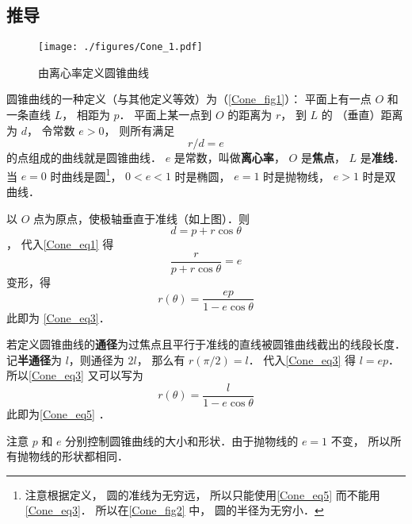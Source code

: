 \subsection{推导}


\begin{figure}[ht]
\centering
\texttt{[image: ./figures/Cone\_1.pdf]}
\caption{由离心率定义圆锥曲线}\label{Cone_fig1}
\end{figure}

圆锥曲线的一种定义（与其他定义等效）为（\autoref{Cone_fig1}）：
平面上有一点 $O$ 和一条直线 $L$， 相距为 $p$． 
平面上某一点到 $O$ 的距离为 $r$， 到 $L$ 的
（垂直）距离为 $d$， 令常数 $e > 0$， 则所有满足
\begin{equation}\label{Cone_eq1}
r/d = e
\end{equation}
的点组成的曲线就是圆锥曲线． $e$ 是常数，叫做\textbf{离心率}， $O$ 是\textbf{焦点}， $L$ 是\textbf{准线}． 当 $e = 0$ 时曲线是圆\footnote{注意根据定义， 圆的准线为无穷远， 所以只能使用\autoref{Cone_eq5} 而不能用\autoref{Cone_eq3}． 所以在\autoref{Cone_fig2} 中， 圆的半径为无穷小．}， $0 < e < 1$ 时是椭圆， $e = 1$ 时是抛物线， $e > 1$ 时是双曲线．

以 $O$ 点为原点，使极轴垂直于准线（如上图）．则 $$d = p + r \cos \theta $$， 代入\autoref{Cone_eq1} 得
\begin{equation}\label{Cone_eq2}
\frac{r}{p + r \cos \theta } = e
\end{equation}
变形，得
\begin{equation}
r(\theta) = \frac{ep}{1 - e\cos \theta }
\end{equation}
此即为 \autoref{Cone_eq3}．

若定义圆锥曲线的\textbf{通径}为过焦点且平行于准线的直线被圆锥曲线截出的线段长度． 记\textbf{半通径}为 $l$，则通径为 $2l$， 那么有 $r(\pi /2) = l$． 代入\autoref{Cone_eq3} 得 $l = ep$． 所以\autoref{Cone_eq3} 又可以写为
\begin{equation}\label{Cone_eq4}
r(\theta)  = \frac{l}{1 - e\cos \theta }
\end{equation}
此即为\autoref{Cone_eq5} ．

注意 $p$ 和 $e$ 分别控制圆锥曲线的大小和形状．由于抛物线的 $e = 1$ 不变， 所以所有抛物线的形状都相同．
